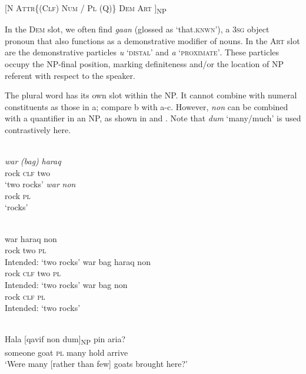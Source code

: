  [\textsc{N  Attr\{(Clf) Num / Pl (Q)\}  Dem Art ]}\textsc{\textsubscript{NP}}
\z

In the \textsc{Dem} slot, we often find \textit{ga}\textit{{\textglotstop}}\textit{an} (glossed as `that.\textsc{knwn}'), a 3\textsc{sg} object pronoun that also functions as a demonstrative modifier of nouns. In the \textsc{Art} slot are the demonstrative particles \textit{u} `\textsc{distal'} and \textit{a} `\textsc{proximate'}. These particles occupy the NP-final position, marking definiteness and/or the location of NP referent with respect to the speaker.

The plural word has its own slot within the NP. It cannot combine with numeral constituents as those in a; compare b with a-c. However, \textit{non} can be combined with a quantifier in an NP, as shown in  and . Note that \textit{dum} `many/much' is used contrastively here.


\ea%
\label{ex:9:21}
 \\
\ea
\gll \textit{war} \textit{(bag)} \textit{haraq}  \\
  rock \textsc{clf} two \\
\glt `two rocks'
\ex
\gll \textit{war} \textit{non}\\
  rock \textsc{pl}\\
 `rocks'
\z
\z


\ea%
\label{ex:9:22}
 \\
\ea
\gll  *war haraq non \\
  rock two \textsc{pl}   \\
\glt Intended: `two rocks'
\ex
\gll *war bag haraq non \\
  rock \textsc{clf} two \textsc{pl}   \\
\glt  Intended: `two rocks'
\ex
\gll *war bag non \\
   rock \textsc{clf} \textsc{pl}  \\
\glt Intended: `two rocks'
\z
\z





\ea%
\label{ex:9:23}
 \\
\gll Hala [{qavif} non {dum}]\textsubscript{NP} pin aria{{\textglotstop}}{?} \\
  someone goat \textsc{pl} many hold arrive   \\
\glt `Were many [rather than few] goats brought here?'
\z







